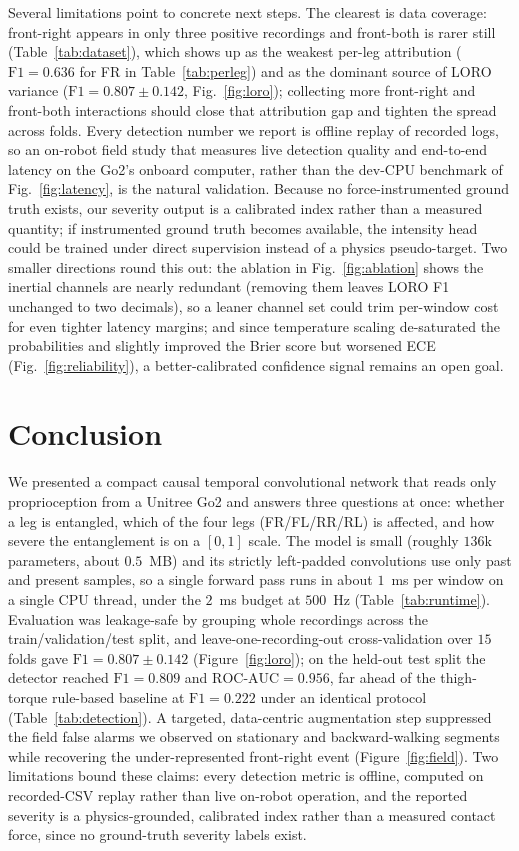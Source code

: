 \documentclass[conference]{IEEEtran}
\begin{document}
Several limitations point to concrete next steps. The clearest is data coverage: front-right appears in only three positive recordings and front-both is rarer still (Table~\ref{tab:dataset}), which shows up as the weakest per-leg attribution ($\mathrm{F1}=0.636$ for FR in Table~\ref{tab:perleg}) and as the dominant source of LORO variance ($\mathrm{F1}=0.807\pm0.142$, Fig.~\ref{fig:loro}); collecting more front-right and front-both interactions should close that attribution gap and tighten the spread across folds. Every detection number we report is offline replay of recorded logs, so an on-robot field study that measures live detection quality and end-to-end latency on the Go2's onboard computer, rather than the dev-CPU benchmark of Fig.~\ref{fig:latency}, is the natural validation. Because no force-instrumented ground truth exists, our severity output is a calibrated index rather than a measured quantity; if instrumented ground truth becomes available, the intensity head could be trained under direct supervision instead of a physics pseudo-target. Two smaller directions round this out: the ablation in Fig.~\ref{fig:ablation} shows the inertial channels are nearly redundant (removing them leaves LORO F1 unchanged to two decimals), so a leaner channel set could trim per-window cost for even tighter latency margins; and since temperature scaling de-saturated the probabilities and slightly improved the Brier score but worsened ECE (Fig.~\ref{fig:reliability}), a better-calibrated confidence signal remains an open goal.

\section{Conclusion}
We presented a compact causal temporal convolutional network that reads only proprioception from a Unitree Go2 and answers three questions at once: whether a leg is entangled, which of the four legs (FR/FL/RR/RL) is affected, and how severe the entanglement is on a $[0,1]$ scale. The model is small (roughly $136$k parameters, about $0.5$~MB) and its strictly left-padded convolutions use only past and present samples, so a single forward pass runs in about $1$~ms per window on a single CPU thread, under the $2$~ms budget at $500$~Hz (Table~\ref{tab:runtime}). Evaluation was leakage-safe by grouping whole recordings across the train/validation/test split, and leave-one-recording-out cross-validation over $15$ folds gave $\mathrm{F1}=0.807\pm0.142$ (Figure~\ref{fig:loro}); on the held-out test split the detector reached $\mathrm{F1}=0.809$ and $\mathrm{ROC\text{-}AUC}=0.956$, far ahead of the thigh-torque rule-based baseline at $\mathrm{F1}=0.222$ under an identical protocol (Table~\ref{tab:detection}). A targeted, data-centric augmentation step suppressed the field false alarms we observed on stationary and backward-walking segments while recovering the under-represented front-right event (Figure~\ref{fig:field}). Two limitations bound these claims: every detection metric is offline, computed on recorded-CSV replay rather than live on-robot operation, and the reported severity is a physics-grounded, calibrated index rather than a measured contact force, since no ground-truth severity labels exist.
\end{document}
